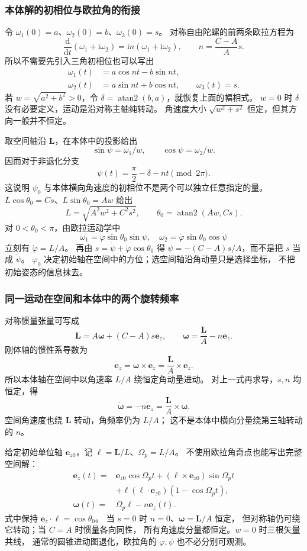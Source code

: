 \documentclass[UTF8,zihao=-4,fontset=fandol,a4paper]{ctexart}
\newcommand{\vect}[1]{\bm{#1}}
\newcommand{\dd}{\mathrm d}
\begin{document}
\subsubsection*{本体解的初相位与欧拉角的衔接}
令 $\omega_1(0)=a$、$\omega_2(0)=b$、$\omega_3(0)=s$。
对称自由陀螺的前两条欧拉方程为
\[
\frac{\dd}{\dd t}(\omega_1+\mathrm i\omega_2)
=\mathrm i n(\omega_1+\mathrm i\omega_2),\qquad n=\frac{C-A}{A}s.
\]
所以不需要先引入三角初相位也可以写出
\[
\begin{aligned}
\omega_1(t)&=a\cos nt-b\sin nt,\\
\omega_2(t)&=a\sin nt+b\cos nt,\qquad \omega_3(t)=s.
\end{aligned}
\]
若 $w=\sqrt{a^2+b^2}>0$，令
$\delta=\operatorname{atan2}(b,a)$，就恢复上面的幅相式。
$w=0$ 时 $\delta$ 没有必要定义，运动是沿对称主轴纯转动。
角速度大小 $\sqrt{w^2+s^2}$ 恒定，但其方向一般并不恒定。

取空间轴沿 $\vect L$，在本体中的投影给出
\[
\sin\psi=\omega_1/w,\qquad\cos\psi=\omega_2/w.
\]
因而对于非退化分支
\[
\psi(t)=\frac\pi2-\delta-nt\pmod{2\pi}.
\]
这说明 $\psi_0$ 与本体横向角速度的初相位不是两个可以独立任意指定的量。
$L\cos\theta_0=Cs$、$L\sin\theta_0=Aw$ 给出
\[
L=\sqrt{A^2w^2+C^2s^2},\qquad
\theta_0=\operatorname{atan2}(Aw,Cs).
\]
对 $0<\theta_0<\pi$，由欧拉运动学中
\[
\omega_1=\dot\varphi\sin\theta_0\sin\psi,
\quad
\omega_2=\dot\varphi\sin\theta_0\cos\psi
\]
立刻有 $\dot\varphi=L/A$。
再由 $s=\dot\psi+\dot\varphi\cos\theta_0$ 得
$\dot\psi=-(C-A)s/A$，而不是把 $s$ 当成 $\dot\psi$。
$\varphi_0$ 决定初始轴在空间中的方位；选空间轴沿角动量只是选择坐标，
不把初始姿态的信息抹去。

\subsubsection*{同一运动在空间和本体中的两个旋转频率}
对称惯量张量可写成
\[
\vect L=A\vect\omega+(C-A)s\vect e_z,
\qquad
\vect\omega=\frac{\vect L}{A}-n\vect e_z.
\]
刚体轴的惯性系导数为
\[
\dot{\vect e}_z=\vect\omega\times\vect e_z
=\frac{\vect L}{A}\times\vect e_z.
\]
所以本体轴在空间中以角速率 $L/A$ 绕恒定角动量进动。
对上一式再求导，$s,n$ 均恒定，得
\[
\dot{\vect\omega}=-n\dot{\vect e}_z
=\frac{\vect L}{A}\times\vect\omega.
\]
空间角速度也绕 $\vect L$ 转动，角频率仍为 $L/A$；
这不是本体中横向分量绕第三轴转动的 $n$。

给定初始单位轴 $\vect e_{z0}$，记
$\vect\ell=\vect L/L$、$\Omega_p=L/A$。
不使用欧拉角奇点也能写出完整空间解：
\[
\begin{aligned}
\vect e_z(t)={}&\vect e_{z0}\cos\Omega_pt
+(\vect\ell\times\vect e_{z0})\sin\Omega_pt\\
&+\vect\ell(\vect\ell\cdot\vect e_{z0})(1-\cos\Omega_pt),\\
\vect\omega(t)={}&\Omega_p\vect\ell-n\vect e_z(t).
\end{aligned}
\]
式中保持 $\vect e_z\cdot\vect\ell=\cos\theta_0$。
当 $s=0$ 时 $n=0$、$\vect\omega=\vect L/A$ 恒定，
但对称轴仍可绕它转动；当 $C=A$ 时惯量各向同性，
所有角速度分量都恒定。$w=0$ 时三根矢量共线，
通常的圆锥进动图退化，欧拉角的 $\varphi,\psi$ 也不必分别可观测。
\end{document}
